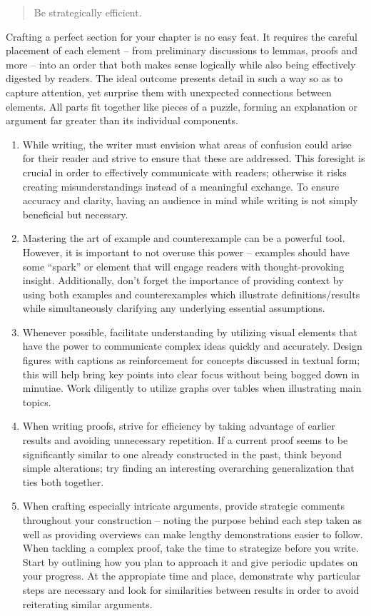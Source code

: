 \documentclass[
  twoside,
  12pt,
  letterpaper,
  fleqn]{article}
\providecommand{\tightlist}{%
  \setlength{\itemsep}{0pt}\setlength{\parskip}{0pt}}\usepackage{longtable,booktabs,array}
\begin{document}
\begin{quote}
Be strategically efficient.
\end{quote}

Crafting a perfect section for your chapter is no easy feat. It requires
the careful placement of each element -- from preliminary discussions to
lemmas, proofs and more -- into an order that both makes sense logically
while also being effectively digested by readers. The ideal outcome
presents detail in such a way so as to capture attention, yet surprise
them with unexpected connections between elements. All parts fit
together like pieces of a puzzle, forming an explanation or argument far
greater than its individual components.

\begin{enumerate}
\def\labelenumi{\arabic{enumi}.}
\tightlist
\item
  While writing, the writer must envision what areas of confusion could
  arise for their reader and strive to ensure that these are addressed.
  This foresight is crucial in order to effectively communicate with
  readers; otherwise it risks creating misunderstandings instead of a
  meaningful exchange. To ensure accuracy and clarity, having an
  audience in mind while writing is not simply beneficial but necessary.
\item
  Mastering the art of example and counterexample can be a powerful
  tool. However, it is important to not overuse this power -- examples
  should have some ``spark'' or element that will engage readers with
  thought-provoking insight. Additionally, don't forget the importance
  of providing context by using both examples and counterexamples which
  illustrate definitions/results while simultaneously clarifying any
  underlying essential assumptions.
\item
  Whenever possible, facilitate understanding by utilizing visual
  elements that have the power to communicate complex ideas quickly and
  accurately. Design figures with captions as reinforcement for concepts
  discussed in textual form; this will help bring key points into clear
  focus without being bogged down in minutiae. Work diligently to
  utilize graphs over tables when illustrating main topics.
\item
  When writing proofs, strive for efficiency by taking advantage of
  earlier results and avoiding unnecessary repetition. If a current
  proof seems to be significantly similar to one already constructed in
  the past, think beyond simple alterations; try finding an interesting
  overarching generalization that ties both together.
\item
  When crafting especially intricate arguments, provide strategic
  comments throughout your construction -- noting the purpose behind
  each step taken as well as providing overviews can make lengthy
  demonstrations easier to follow. When tackling a complex proof, take
  the time to strategize before you write. Start by outlining how you
  plan to approach it and give periodic updates on your progress. At the
  appropiate time and place, demonstrate why particular steps are
  necessary and look for similarities between results in order to avoid
  reiterating similar arguments.
\end{enumerate}
\end{document}
